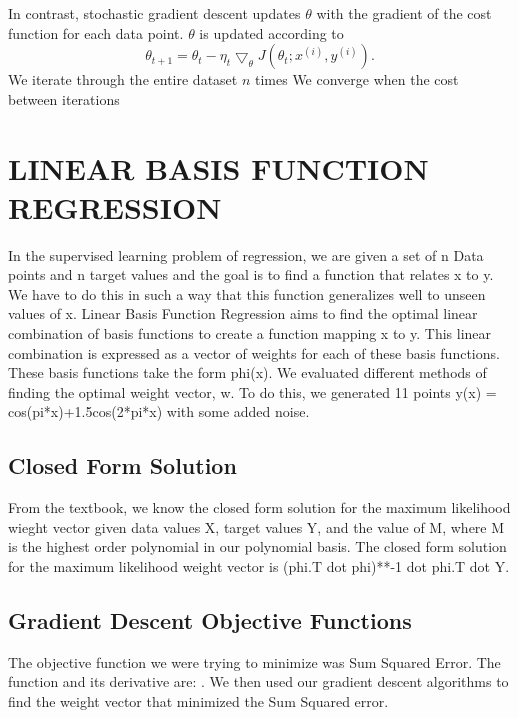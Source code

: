 \documentclass[a4paper,twoside]{article}
\begin{document}
In contrast, stochastic gradient descent updates $\theta$ with the gradient of the cost function for each data point. $\theta$ is updated according to 
\begin{equation}
\theta_{t+1} = \theta_t - \eta_t \bigtriangledown_\theta J(\theta_t; x^{(i)}, y^{(i)}).
\end{equation}
 We iterate through the entire dataset $n$ times  We converge when the cost between iterations 



\section{\uppercase{Linear Basis Function Regression}}

In the supervised learning problem of regression, we are given a set of n Data points and n target values and the goal is to find a function that relates x to y. We have to do this in such a way that this function generalizes well to unseen values of x. Linear Basis Function Regression aims to find the optimal linear combination of basis functions to create a function mapping x to y. This linear combination is expressed as a vector of weights for each of these basis functions. These basis functions take the form phi(x). We evaluated different methods of finding the optimal weight vector, w. To do this, we generated 11 points y(x) = cos(pi*x)+1.5cos(2*pi*x) with some added noise. 

\subsection{Closed Form Solution}

From the textbook, we know the closed form solution for the maximum likelihood wieght vector given data values X, target values Y, and the value of M, where M is the highest order polynomial in our polynomial basis. The closed form solution for the maximum likelihood weight vector is (phi.T dot phi)**-1 dot phi.T dot Y. 

\subsection{Gradient Descent Objective Functions}

The objective function we were trying to minimize was Sum Squared Error. The function and its derivative are: . We then used our gradient descent algorithms to find the weight vector that minimized the Sum Squared error. 
\end{document}
